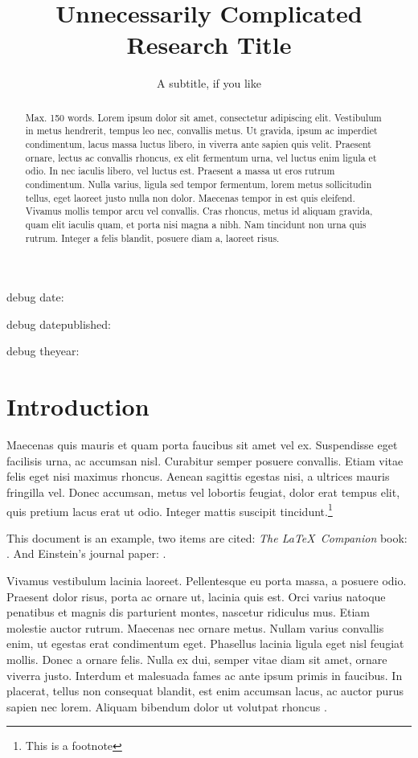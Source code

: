 \documentclass{jcls}
\title{Unnecessarily Complicated Research Title}
\subtitle{A subtitle, if you like}
\begin{document}
\maketitle


debug date: 

debug datepublished: 

debug theyear: \the\year

\begin{abstract}
	Max. 150 words. Lorem ipsum dolor sit amet, consectetur adipiscing elit. Vestibulum in metus hendrerit, tempus leo nec, convallis metus. Ut gravida, ipsum ac imperdiet condimentum, lacus massa luctus libero, in viverra ante sapien quis velit. Praesent ornare, lectus ac convallis rhoncus, ex elit fermentum urna, vel luctus enim ligula et odio. In nec iaculis libero, vel luctus est. Praesent a massa ut eros rutrum condimentum. Nulla varius, ligula sed tempor fermentum, lorem metus sollicitudin tellus, eget laoreet justo nulla non dolor. Maecenas tempor in est quis eleifend. Vivamus mollis tempor arcu vel convallis. Cras rhoncus, metus id aliquam gravida, quam elit iaculis quam, et porta nisi magna a nibh. Nam tincidunt non urna quis rutrum. Integer a felis blandit, posuere diam a, laoreet risus.
\end{abstract}

\section{Introduction}

Maecenas quis mauris et quam porta faucibus sit amet vel ex. Suspendisse eget facilisis urna, ac accumsan nisl. Curabitur semper posuere convallis. Etiam vitae felis eget nisi maximus rhoncus. Aenean sagittis egestas nisi, a ultrices mauris fringilla vel. Donec accumsan, metus vel lobortis feugiat, dolor erat tempus elit, quis pretium lacus erat ut odio. Integer mattis suscipit tincidunt.\footnote{This is a footnote}

This document is an example, two items are cited: \textit{The \LaTeX\ Companion} book: \cite[see][12-14]{latexcompanion}. And Einstein's journal paper: \cite{einstein}.

Vivamus vestibulum lacinia laoreet. Pellentesque eu porta massa, a posuere odio. Praesent dolor risus, porta ac ornare ut, lacinia quis est. Orci varius natoque penatibus et magnis dis parturient montes, nascetur ridiculus mus. Etiam molestie auctor rutrum. Maecenas nec ornare metus. Nullam varius convallis enim, ut egestas erat condimentum eget. Phasellus lacinia ligula eget nisl feugiat mollis. Donec a ornare felis. Nulla ex dui, semper vitae diam sit amet, ornare viverra justo. Interdum et malesuada fames ac ante ipsum primis in faucibus. In placerat, tellus non consequat blandit, est enim accumsan lacus, ac auctor purus sapien nec lorem. Aliquam bibendum dolor ut volutpat rhoncus .
\end{document}
